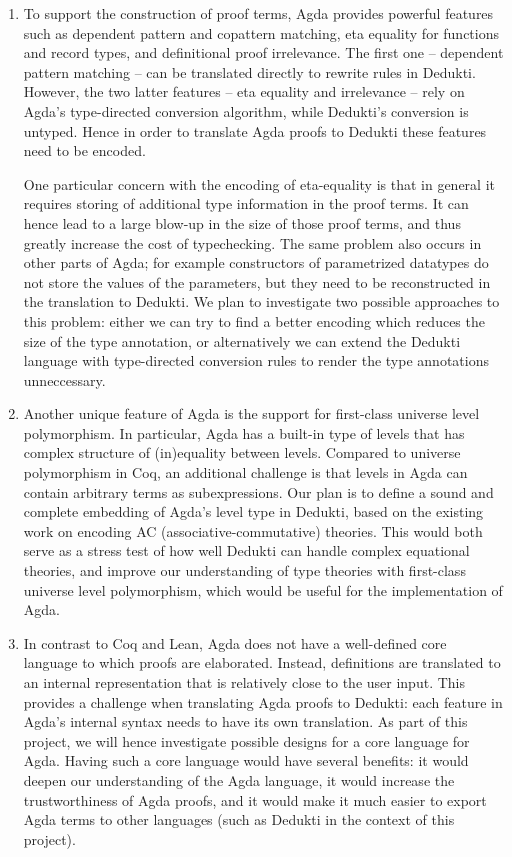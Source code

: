 \begin{enumerate}
\item To support the construction of proof terms, Agda provides powerful
features such as dependent pattern and copattern matching, eta
equality for functions and record types, and definitional proof
irrelevance. The first one – dependent pattern matching – can be
translated directly to rewrite rules in Dedukti. However, the two
latter features – eta equality and irrelevance – rely on Agda’s
type-directed conversion algorithm, while Dedukti’s conversion is
untyped. Hence in order to translate Agda proofs to Dedukti these
features need to be encoded.

One particular concern with the encoding of eta-equality is that in
general it requires storing of additional type information in the
proof terms. It can hence lead to a large blow-up in the size of those
proof terms, and thus greatly increase the cost of typechecking. The
same problem also occurs in other parts of Agda; for example
constructors of parametrized datatypes do not store the values of the
parameters, but they need to be reconstructed in the translation to
Dedukti. We plan to investigate two possible approaches to this
problem: either we can try to find a better encoding which reduces the
size of the type annotation, or alternatively we can extend the
Dedukti language with type-directed conversion rules to render the
type annotations unneccessary.

\item Another unique feature of Agda is the support for first-class
universe level polymorphism. In particular, Agda has a built-in type
of levels that has complex structure of (in)equality between
levels. Compared to universe polymorphism in Coq, an additional
challenge is that levels in Agda can contain arbitrary terms as
subexpressions. Our plan is to define a sound and complete embedding
of Agda’s level type in Dedukti, based on the existing work on
encoding AC (associative-commutative) theories. This would both serve
as a stress test of how well Dedukti can handle complex equational
theories, and improve our understanding of type theories with
first-class universe level polymorphism, which would be useful for the
implementation of Agda.

\item In contrast to Coq and Lean, Agda does not have a well-defined
core language to which proofs are elaborated. Instead, definitions are
translated to an internal representation that is relatively close to
the user input. This provides a challenge when translating Agda proofs
to Dedukti: each feature in Agda’s internal syntax needs to have its
own translation. As part of this project, we will hence investigate
possible designs for a core language for Agda. Having such a core
language would have several benefits: it would deepen our
understanding of the Agda language, it would increase the
trustworthiness of Agda proofs, and it would make it much easier to
export Agda terms to other languages (such as Dedukti in the context
of this project).


\end{enumerate}
